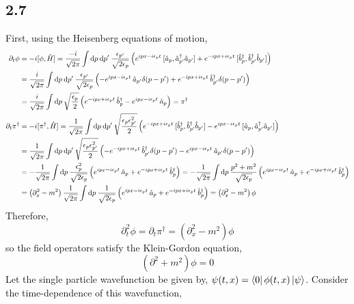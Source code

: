 \documentclass[12pt]{extarticle}
\begin{document}
\subsection*{2.7}
First, using the Heisenberg equations of motion,
\begin{align*}
\partial_t \phi & = - i [\phi, \hat{H}] = \frac{-i}{\sqrt{2\pi}} \int \mathrm{d}p \: \mathrm{d}p' \: \frac{\epsilon_{p'}}{\sqrt{2 \epsilon_p}} \left( e^{i p x - i \epsilon_p t} \: [\hat{a}_p, \hat{a}^\dagger_{p'} \hat{a}_{p'}] + e^{- i p x + i \epsilon_p t} \: [\hat{b}^\dagger_p, \hat{b}^\dagger_{p'} \hat{b}_{p'}] \right) 
\\
& = \frac{i}{\sqrt{2\pi}} \int \mathrm{d}p \: \mathrm{d}p' \: \frac{\epsilon_{p'}}{\sqrt{2 \epsilon_p}} \left( - e^{i p x - i \epsilon_p t} \: \hat{a}_{p'} \delta(p - p')  + e^{- i p x + i \epsilon_p t} \: \hat{b}^\dagger_{p'} \delta(p - p') \right) 
\\
& = \frac{i}{\sqrt{2\pi}} \int \mathrm{d}p \: \sqrt{\frac{\epsilon_p}{2}} \left(e^{- i p x + i \epsilon_p t} \: \hat{b}^\dagger_{p}  - e^{i p x - i \epsilon_p t} \: \hat{a}_{p} \right) = \pi^\dagger
\\
\partial_t \pi^\dagger & = -i [\pi^\dagger, \hat{H}] = \frac{1}{\sqrt{2\pi}} \int \mathrm{d}p \: \mathrm{d}p' \: \sqrt{\frac{\epsilon_p \epsilon_{p'}^2}{2}} \left( e^{- i p x + i \epsilon_p t} \: [\hat{b}^\dagger_p, \hat{b}^\dagger_{p'} \hat{b}_{p'}] - e^{i p x - i \epsilon_p t} \: [\hat{a}_p, \hat{a}^\dagger_{p'} \hat{a}_{p'}] \right) 
\\
& = \frac{1}{\sqrt{2\pi}} \int \mathrm{d}p \: \mathrm{d}p' \: \sqrt{\frac{\epsilon_p \epsilon_{p'}^2}{2}}  \left( - e^{- i p x + i \epsilon_p t} \: \hat{b}^\dagger_{p'} \delta(p - p') - e^{i p x - i \epsilon_p t} \: \hat{a}_{p'} \delta(p - p') \right) 
\\
& = - \frac{1}{\sqrt{2\pi}} \int \mathrm{d}p \: \frac{\epsilon_p^2}{\sqrt{2 \epsilon_p}} \left( e^{i p x - i \epsilon_p t} \: \hat{a}_{p} + e^{- i p x + i \epsilon_p t} \: \hat{b}^\dagger_{p} \right) = - \frac{1}{\sqrt{2\pi}} \int \mathrm{d}p \: \frac{p^2 + m^2}{\sqrt{2 \epsilon_p}} \left( e^{i p x - i \epsilon_p t} \: \hat{a}_{p} + e^{- i p x + i \epsilon_p t} \: \hat{b}^\dagger_{p} \right) 
\\
& = \left( \partial_x^2 - m^2 \right) \frac{1}{\sqrt{2\pi}} \int \mathrm{d}p \: \frac{1}{\sqrt{2 \epsilon_p}} \left( e^{i p x - i \epsilon_p t} \: \hat{a}_{p} + e^{- i p x + i \epsilon_p t} \: \hat{b}^\dagger_{p} \right) = \left( \partial_x^2 - m^2 \right) \phi
\end{align*}
Therefore,
\[ \partial_t^2 \phi = \partial_t \pi^\dagger = (\partial_x^2 - m^2) \phi \]
so the field operators satisfy the Klein-Gordon equation,
\[ \left( \partial^2 + m^2 \right) \phi = 0\]
Let the single particle wavefunction be given by, $\psi(t, x) = \left< 0 \right| \phi(t, x) \left| \psi \right>$. Consider the time-dependence of this wavefunction,
\end{document}
